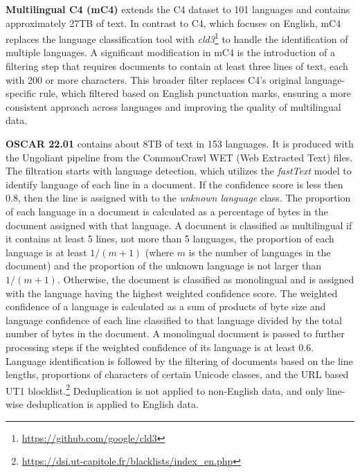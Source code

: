 \textbf{Multilingual C4 (mC4)} \cite{xue_constant_etal2021} extends the C4 dataset to 
101 languages and contains approximately 27TB of text. In contrast to C4, which focuses 
on English, mC4 replaces the language classification tool with 
\textit{cld3}\footnote{\url{https://github.com/google/cld3}} to handle the identification of multiple languages.
A significant modification in mC4 is the introduction of a filtering step that requires documents to contain at least three lines of text, each with 200 or more characters. This broader filter replaces C4’s original language-specific rule, which filtered based on English punctuation marks, ensuring a more consistent approach across languages and improving the quality of multilingual data.



\textbf{OSCAR 22.01} \cite{abadji_suarez_etal2022} contains about 8TB of text in 153 languages.
It is produced with the Ungoliant pipeline \cite{abadji_suarez_etal2021} from the CommonCrawl WET (Web Extracted Text) files.
The filtration starts with language detection, which utilizes
the \textit{fastText} model
to identify language of each line in a document.
If the confidence score is less then 0.8,
then the line is assigned with to the \textit{unknown language} class.
The proportion of each language in a document is calculated
as a percentage of bytes in the document assigned with that language.
A document is classified as multilingual 
if it contains at least 5 lines, not more than 5 languages, the
proportion of each language is at least ${1}/{(m + 1)}$ (where $m$
is the number of languages in the document) and the proportion of 
the unknown language is not larger than ${1}/{(m + 1)}$.
Otherwise, the document is classified as monolingual
and is assigned with the language having the highest weighted confidence
score. The weighted confidence of a language is calculated as a sum of products of
byte size and language confidence of each line classified to that language
divided by the total number of bytes in the document.
A monolingual document is passed to further processing steps
if the weighted confidence of its language is at least 0.6.
Language identification is followed by
the filtering of documents based on the line lengths, proportions
of characters of certain Unicode classes, and the URL based UT1 blocklist.\footnote{\url{https://dsi.ut-capitole.fr/blacklists/index_en.php}}
Deduplication is not applied to non-English data, and only line-wise deduplication
is applied to English data.

